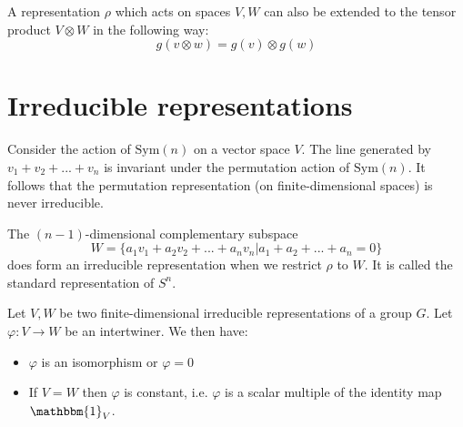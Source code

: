         \begin{example}
        	A representation $\rho$ which acts on spaces $V, W$ can also be extended to the tensor product  $V\otimes W$ in the following way:
            \begin{equation}
            	g(v\otimes w) = g(v)\otimes g(w)
            \end{equation}
        \end{example}
        

\section{Irreducible representations}

	
	\begin{example}
		Consider the action of $\text{Sym}(n)$ on a vector space $V$. The line generated by $v_1+v_2+...+v_n$ is invariant under the permutation action of $\text{Sym}(n)$. It follows that the permutation representation (on finite-dimensional spaces) is never irreducible.
		
		The $(n-1)$-dimensional complementary subspace
		\begin{equation}
			W = \{a_1v_1 + a_2v_2 + ... + a_nv_n|a_1 + a_2 + ... + a_n = 0\}
		\end{equation}
		does form an irreducible representation when we restrict $\rho$ to $W$. It is called the standard representation of $S^n$.
	\end{example}
        
        \begin{theorem}\label{rep:schurs_lemma}
        	Let $V, W$ be two finite-dimensional irreducible representations of a group $G$. Let $\varphi: V\rightarrow W$ be an intertwiner. We then have:
            	\begin{itemize}
	        	\item $\varphi$ is an isomorphism or $\varphi = 0$
	                \item If $V = W$ then $\varphi$ is constant, i.e. $\varphi$ is a scalar multiple of the identity map $\mathbbm{1}_V$.
        	\end{itemize}
        \end{theorem}
        
